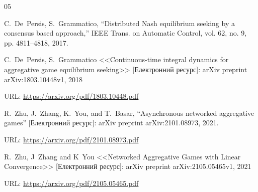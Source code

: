 \documentclass[a4paper]{article}
\begin{document}
\begin{thebibliography}{05}
{ C.~De~Persis, S.~Grammatico, “Distributed Nash equilibrium seeking by a consensus based approach,” IEEE Trans. on Automatic Control, vol. 62, no. 9, pp. 4811–4818, 2017.

 C.~De~Persis, S.~Grammatico <<Continuous-time integral dynamics for aggregative game equilibrium seeking>> [Електронний ресурс]: arXiv preprint arXiv:1803.10448v1, 2018

URL: \url{https://arxiv.org/pdf/1803.10448.pdf}

 R.~Zhu, J.~Zhang, K.~You, and T.~Basar, “Asynchronous networked
aggregative games” [Електронний ресурс]: arXiv preprint arXiv:2101.08973, 2021.

URL: \url{https://arxiv.org/pdf/2101.08973.pdf}

 R.~Zhu, J~Zhang and K~You <<Networked Aggregative Games with Linear Convergence>> [Електронний ресурс]: arXiv preprint arXiv:2105.05465v1, 2021

URL: \url{https://arxiv.org/pdf/2105.05465.pdf}

}
\end{thebibliography}
\end{document}

